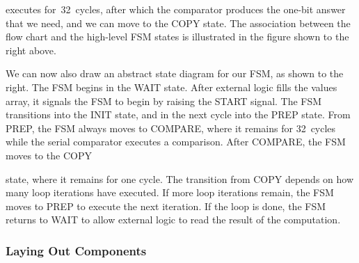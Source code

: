 executes for~32~cycles, after which the comparator
produces the one-bit answer that we need, and we can move to the
{\tfix COPY} state.  The association between the flow chart and the
high-level FSM states is illustrated in the figure shown to the right
above.

\begin{minipage}{3.25in}
We can now also draw an abstract state diagram for our FSM, as shown
to the right.  The FSM begins in the {\tfix WAIT} state.  After external
logic fills the {\tfix values} array, it signals the FSM to begin by
raising the {\tfix START} signal.  The FSM transitions into the 
{\tfix INIT} state, and in the next cycle into the {\tfix PREP} state.
From {\tfix PREP}, the FSM always moves to {\tfix COMPARE}, where it
remains for 32~cycles while the serial comparator executes a comparison.
After {\tfix COMPARE}, the FSM moves to the {\tfix COPY}\linebreak\mpdone
\end{minipage}\hspace{.25in}%
\begin{minipage}{3in}
\centerline{}
\end{minipage}

state, where
it remains for one cycle.  The transition from {\tfix COPY} depends on
how many loop iterations have executed.  If more loop iterations remain,
the FSM moves to {\tfix PREP} to execute the next iteration.  If the
loop is done, the FSM returns to {\tfix WAIT} to allow external logic
to read the result of the computation.\\

\pagebreak

\subsubsection{Laying Out Components}

